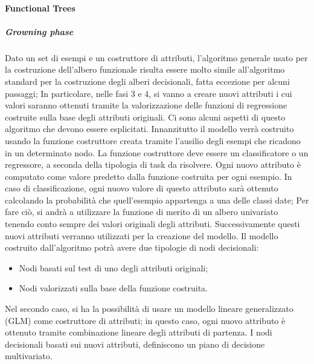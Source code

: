 \paragraph{Functional Trees}
\subparagraph{Growning phase}
	Dato un set di esempi e un costruttore di attributi, l'algoritmo generale usato per la costruzione dell'albero funzionale risulta essere molto simile all'algoritmo standard per la costruzione degli alberi decisionali, fatta eccezione per alcuni passaggi; In particolare, nelle fasi 3 e 4, si vanno a creare nuovi attributi i cui valori saranno ottenuti tramite la valorizzazione delle funzioni di regressione costruite sulla base degli attributi originali. Ci sono alcuni aspetti di questo algoritmo che devono essere esplicitati. Innanzitutto il modello verrà costruito usando la funzione costruttore creata tramite l'ausilio degli esempi che ricadono in un determinato nodo. La funzione costruttore deve essere un classificatore o un regressore, a seconda della tipologia di task da risolvere. Ogni nuovo attributo è computato come valore predetto dalla funzione costruita per ogni esempio. In caso di classificazione, ogni nuovo valore di questo attributo sarà ottenuto calcolando la probabilità che quell'esempio appartenga a una delle classi date; Per fare ciò, si andrà a utilizzare la funzione di merito di un albero univariato tenendo conto sempre dei valori originali degli attributi. Successivamente questi nuovi attributi verranno utilizzati per la creazione del modello.
	Il modello costruito dall'algoritmo potrà avere due tipologie di nodi decisionali: 
	\begin{itemize}
		\item Nodi basati sul test di uno degli attributi originali;
		\item Nodi valorizzati sulla base della funzione costruita.
	\end{itemize} 
	Nel secondo caso, si ha la possibilità di usare un modello lineare generalizzato (GLM) come costruttore di attributi; in questo caso, ogni nuovo attributo è ottenuto tramite combinazione lineare degli attributi di partenza. I nodi decisionali basati sui nuovi attributi, definiscono un piano di decisione multivariato.

